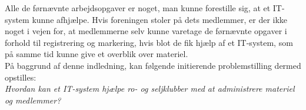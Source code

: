 Alle de førnævnte arbejdsopgaver er noget, man kunne forestille sig, at et IT-system kunne afhjælpe. Hvis foreningen stoler på dets medlemmer, er der ikke noget i vejen for, at medlemmerne selv kunne varetage de førnævnte opgaver i forhold til registrering og markering, hvis blot de fik hjælp af et IT-system, som på samme tid kunne give et overblik over materiel.\\

På baggrund af denne indledning, kan følgende initierende problemstilling dermed opstilles:\\

\textit{Hvordan kan et IT-system hjælpe ro- og seljklubber med at administrere materiel og medlemmer?}
